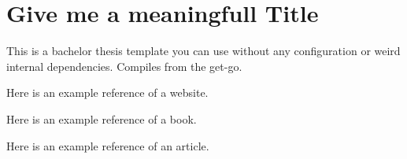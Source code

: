\chapter{Give me a meaningfull Title}
This is a bachelor thesis template you can use without any configuration or weird internal dependencies. Compiles from the get-go.

Here is an example reference of a website. \citep{google}

Here is an example reference of a book. \citep{goetz2006java}

Here is an example reference of an article. \cite{cattell2011scalable}
